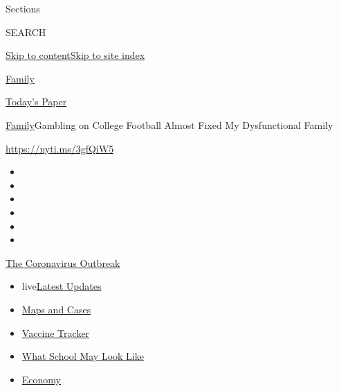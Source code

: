 Sections

SEARCH

\protect\hyperlink{site-content}{Skip to
content}\protect\hyperlink{site-index}{Skip to site index}

\href{https://www.nytimes3xbfgragh.onion/section/well/family}{Family}

\href{https://myaccount.nytimes3xbfgragh.onion/auth/login?response_type=cookie\&client_id=vi}{}

\href{https://www.nytimes3xbfgragh.onion/section/todayspaper}{Today's
Paper}

\href{/section/well/family}{Family}\textbar{}Gambling on College
Football Almost Fixed My Dysfunctional Family

\url{https://nyti.ms/3gfQiW5}

\begin{itemize}
\item
\item
\item
\item
\item
\item
\end{itemize}

\href{https://www.nytimes3xbfgragh.onion/news-event/coronavirus?action=click\&pgtype=Article\&state=default\&region=TOP_BANNER\&context=storylines_menu}{The
Coronavirus Outbreak}

\begin{itemize}
\tightlist
\item
  live\href{https://www.nytimes3xbfgragh.onion/2020/08/02/world/coronavirus-updates.html?action=click\&pgtype=Article\&state=default\&region=TOP_BANNER\&context=storylines_menu}{Latest
  Updates}
\item
  \href{https://www.nytimes3xbfgragh.onion/interactive/2020/us/coronavirus-us-cases.html?action=click\&pgtype=Article\&state=default\&region=TOP_BANNER\&context=storylines_menu}{Maps
  and Cases}
\item
  \href{https://www.nytimes3xbfgragh.onion/interactive/2020/science/coronavirus-vaccine-tracker.html?action=click\&pgtype=Article\&state=default\&region=TOP_BANNER\&context=storylines_menu}{Vaccine
  Tracker}
\item
  \href{https://www.nytimes3xbfgragh.onion/interactive/2020/07/29/us/schools-reopening-coronavirus.html?action=click\&pgtype=Article\&state=default\&region=TOP_BANNER\&context=storylines_menu}{What
  School May Look Like}
\item
  \href{https://www.nytimes3xbfgragh.onion/live/2020/07/31/business/stock-market-today-coronavirus?action=click\&pgtype=Article\&state=default\&region=TOP_BANNER\&context=storylines_menu}{Economy}
\end{itemize}

